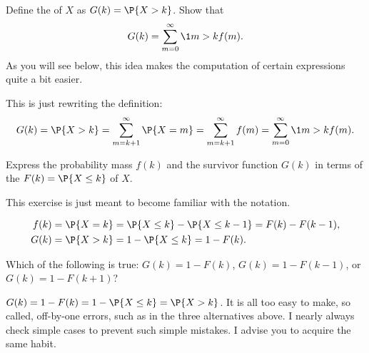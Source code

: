 \begin{exercise}
Define the   of $X$ as $G(k) = \P{X>k}$. Show that
\begin{equation*}
  G(k) = \sum_{m=0}^\infty \1{m>k} f(m).
\end{equation*}
As you will see below, this idea  makes the computation of certain expressions quite a bit easier.
\begin{solution}
  This is just rewriting the definition:
\begin{equation*}
G(k) = \P{X>k} = \sum_{m=k+1}^\infty \P{X=m} = \sum_{m=k+1}^\infty f(m)=\sum_{m=0}^\infty \1{m>k}f(m).
\end{equation*}
\end{solution}
\end{exercise}

\begin{exercise}
  Express the probability mass  $f(k)$ and the survivor function $G(k)$ in terms of the  $F(k)=\P{X\leq k}$ of $X$.
\begin{hint}
This exercise is just meant to become familiar with the notation.
\end{hint}
\begin{solution}
    \begin{align*}
    f(k) &= \P{X=k} = \P{X\leq k} - \P{X\leq k-1} = F(k)-F(k-1), \\
    G(k) &= \P{X>k} = 1 - \P{X\leq k} = 1-F(k).        
    \end{align*}
\end{solution}
\end{exercise}

\begin{extra}
  Which of the following is true: $G(k) = 1-F(k)$, $G(k) = 1-F(k-1)$, or $G(k) = 1-F(k+1)$?
\begin{solution}
  $G(k) = 1- F(k) = 1-\P{X\leq k} = \P{X>k}$. 
    It is all too easy to make, so called, off-by-one errors, such as
    in the three alternatives above.  I nearly always check simple
    cases to prevent such simple mistakes. I advise you to acquire the
    same habit.
\end{solution}
\end{extra}


